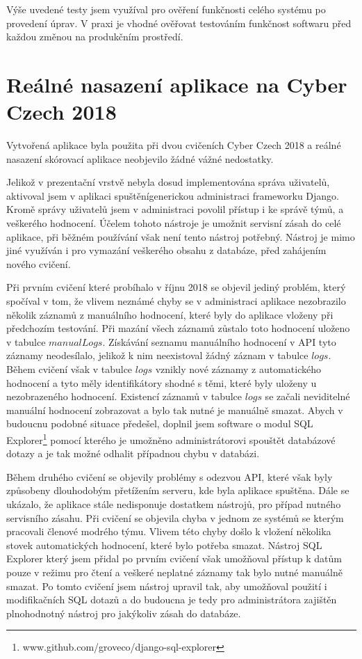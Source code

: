 \documentclass[
  digital, %
  twoside, %
  table,   %
  nolof,     %
  nolot,     %
]{fithesis3}
\begin{document}
Výše uvedené testy jsem využíval pro ověření funkčnosti celého systému po provedení úprav. V praxi je vhodné ověřovat testováním funkčnost softwaru před každou změnou na produkčním prostředí.

\section{Reálné nasazení aplikace na Cyber Czech 2018}


Vytvořená aplikace byla použita při dvou cvičeních Cyber Czech 2018 a reálné nasazení skórovací aplikace neobjevilo žádné vážné nedostatky.

Jelikož v prezentační vrstvě nebyla dosud implementována správa uživatelů, aktivoval jsem v aplikaci spuštěnígenerickou administraci frameworku Django. Kromě správy uživatelů jsem v administraci povolil přístup i ke správě týmů, a veškerého hodnocení. Účelem tohoto nástroje je umožnit servisní zásah do celé aplikace, při běžném používání však není tento nástroj potřebný. Nástroj je mimo jiné využíván i pro vymazání veškerého obsahu z databáze, před zahájením nového cvičení.

Při prvním cvičení které probíhalo v říjnu 2018 se objevil jediný problém, který spočíval v tom, že vlivem neznámé chyby se v administraci aplikace nezobrazilo několik záznamů z manuálního hodnocení, které byly do aplikace vloženy při předchozím testování. Při mazání všech záznamů zůstalo toto hodnocení uloženo v tabulce $manualLogs$. Získávání seznamu manuálního hodnocení v API tyto záznamy neodesílalo, jelikož k nim neexistoval žádný záznam v tabulce $logs$. Během cvičení však v tabulce $logs$ vznikly nové  záznamy z automatického hodnocení a tyto měly identifikátory shodné s těmi, které byly uloženy u nezobrazeného hodnocení. Existencí záznamů v tabulce $logs$ se začali neviditelné manuální hodnocení zobrazovat a bylo tak nutné je manuálně smazat. Abych v budoucnu podobné situace předešel, doplnil jsem software o modul SQL Explorer\footnote{www.github.com/groveco/django-sql-explorer} pomocí kterého je umožněno administrátorovi spouštět databázové dotazy a je tak možné odhalit případnou chybu v databázi.

Během druhého cvičení se objevily problémy s odezvou API, které však byly způsobeny dlouhodobým přetížením serveru, kde byla aplikace spuštěna. Dále se ukázalo, že aplikace stále nedisponuje dostatkem nástrojů, pro případ nutného servisního zásahu. Při cvičení se objevila chyba v jednom ze systémů se kterým pracovali členové modrého týmu. Vlivem této chyby došlo k vložení několika stovek automatických hodnocení, které bylo potřeba smazat. Nástroj SQL Explorer který jsem přidal po prvním cvičení však umožňoval přístup k datům pouze v režimu pro čtení a veškeré neplatné záznamy tak bylo nutné manuálně smazat. Po tomto cvičení jsem nástroj upravil tak, aby umožňoval použití i modifikačních SQL dotazů a do budoucna je tedy pro administrátora zajištěn plnohodnotný nástroj pro jakýkoliv zásah do databáze.
\end{document}
